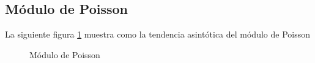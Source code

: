 \subsection{Módulo de Poisson}

La siguiente figura \ref{poisson-fig} muestra como la tendencia asintótica del
módulo de Poisson 
\begin{figure}[h]
  \centering
  
  \caption{Módulo de Poisson}\label{poisson-fig}
\end{figure}
